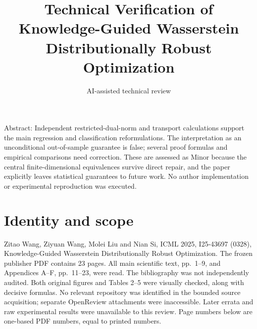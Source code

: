 \documentclass[10pt]{article}
\title{Technical Verification of Knowledge-Guided Wasserstein Distributionally Robust Optimization}
\author{AI-assisted technical review}
\date{}
\begin{document}
\maketitle
Abstract: Independent restricted-dual-norm and transport calculations support the main regression and classification reformulations. The interpretation as an unconditional out-of-sample guarantee is false; several proof formulas and empirical comparisons need correction. These are assessed as Minor because the central finite-dimensional equivalences survive direct repair, and the paper explicitly leaves statistical guarantees to future work. No author implementation or experimental reproduction was executed.\par
\section*{Identity and scope}
Zitao Wang, Ziyuan Wang, Molei Liu and Nian Si, ICML 2025, I25-43697 (0328), Knowledge-Guided Wasserstein Distributionally Robust Optimization. The frozen publisher PDF contains 23 pages. All main scientific text, pp. 1–9, and Appendices A–F, pp. 11–23, were read. The bibliography was not independently audited. Both original figures and Tables 2–5 were visually checked, along with decisive formulas. No relevant repository was identified in the bounded source acquisition; separate OpenReview attachments were inaccessible. Later errata and raw experimental results were unavailable to this review. Page numbers below are one-based PDF numbers, equal to printed numbers.\par
\end{document}
